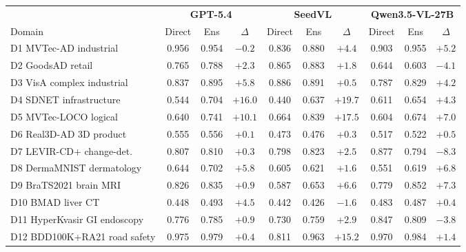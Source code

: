 \begin{table}[t]
\centering
\small
\setlength{\tabcolsep}{3.8pt}
\begin{tabular}{l|ccc|ccc|ccc}
\toprule
& \multicolumn{3}{c|}{\textbf{GPT-5.4}} & \multicolumn{3}{c|}{\textbf{SeedVL}} & \multicolumn{3}{c}{\textbf{Qwen3.5-VL-27B}} \\
Domain & Direct & Ens & $\Delta$ & Direct & Ens & $\Delta$ & Direct & Ens & $\Delta$ \\
\midrule
D1  MVTec-AD industrial      & 0.956 & 0.954 & $-0.2$ & 0.836 & 0.880 & $+4.4$ & 0.903 & 0.955 & $+5.2$ \\
D2  GoodsAD retail            & 0.765 & 0.788 & $+2.3$ & 0.865 & 0.883 & $+1.8$ & 0.644 & 0.603 & $-4.1$ \\
D3  VisA complex industrial   & 0.837 & 0.895 & $+5.8$ & 0.886 & 0.891 & $+0.5$ & 0.787 & 0.829 & $+4.2$ \\
D4  SDNET infrastructure      & 0.544 & 0.704 & $+16.0$ & 0.440 & 0.637 & $+19.7$ & 0.611 & 0.654 & $+4.3$ \\
D5  MVTec-LOCO logical        & 0.640 & 0.741 & $+10.1$ & 0.664 & 0.839 & $+17.5$ & 0.604 & 0.674 & $+7.0$ \\
D6  Real3D-AD 3D product      & 0.555 & 0.556 & $+0.1$  & 0.473 & 0.476 & $+0.3$  & 0.517 & 0.522 & $+0.5$ \\
D7  LEVIR-CD+ change-det.     & 0.807 & 0.810 & $+0.3$  & 0.798 & 0.823 & $+2.5$  & 0.877 & 0.794 & $-8.3$ \\
D8  DermaMNIST dermatology    & 0.644 & 0.702 & $+5.8$  & 0.605 & 0.621 & $+1.6$  & 0.551 & 0.619 & $+6.8$ \\
D9  BraTS2021 brain MRI       & 0.826 & 0.835 & $+0.9$  & 0.587 & 0.653 & $+6.6$  & 0.779 & 0.852 & $+7.3$ \\
D10 BMAD liver CT             & 0.448 & 0.493 & $+4.5$  & 0.442 & 0.426 & $-1.6$  & 0.483 & 0.487 & $+0.4$ \\
D11 HyperKvasir GI endoscopy  & 0.776 & 0.785 & $+0.9$  & 0.730 & 0.759 & $+2.9$  & 0.847 & 0.809 & $-3.8$ \\
D12 BDD100K+RA21 road safety  & 0.975 & 0.979 & $+0.4$  & 0.811 & 0.963 & $+15.2$ & 0.970 & 0.984 & $+1.4$ \\

\end{tabular}
\end{table}
